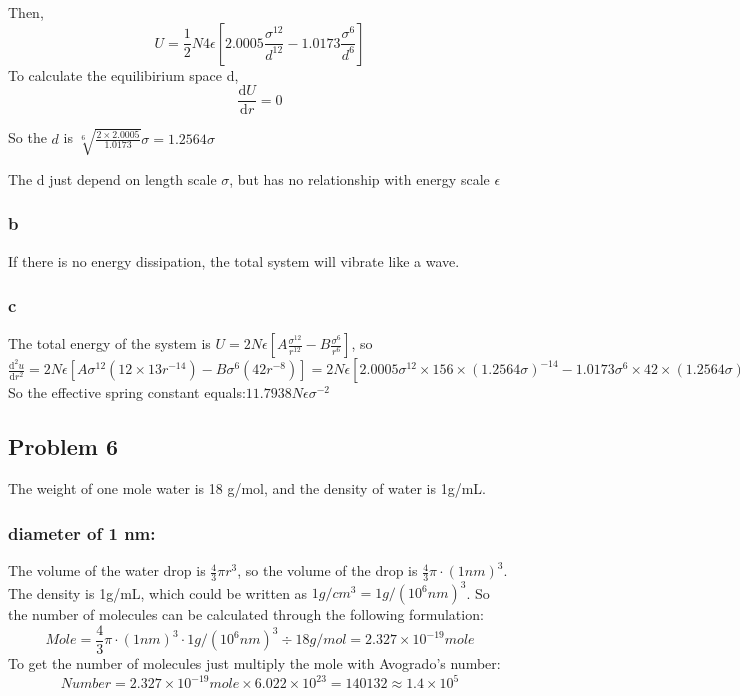 \documentclass[a4paper]{article}
\begin{document}
Then,
\begin{equation}
	U=\frac{1}{2}N 4 \epsilon [2.0005 \frac{\sigma^12}{d^12}-1.0173 \frac{\sigma^6}{d^6}]
\end{equation}
To calculate the equilibirium space d, 
\begin{equation}
	\frac{\mathrm{d} U}{\mathrm{d}r}=0
\end{equation}

So the $d$ is $\sqrt[6]{\frac{2 \times 2.0005}{1.0173}} \sigma=1.2564 \sigma$

The d just depend on length scale $\sigma$, but has no relationship with energy scale $\epsilon$

\subsubsection{b}
If there is no energy dissipation, the total system will vibrate like a wave. 

\subsubsection{c}
The total energy of the system is $U=2N \epsilon [A\frac{\sigma^{12}}{r^{12}}-B\frac{\sigma^{6}}{r^{6}}]$, so $\frac{\mathrm{d^{2}}u}{\mathrm{d}r^{2}}=2N \epsilon [A \sigma^{12}(12 \times 13 r^{-14})-B \sigma^{6}(42 r^{-8})]=2N\epsilon [2.0005\sigma^{12} \times 156 \times(1.2564 \sigma)^{-14}-1.0173\sigma^{6}\times 42 \times (1.2564 \sigma)^{-8}]$
So the effective spring constant equals:$11.7938N\epsilon \sigma^{-2}$

\subsection{Problem 6}
The weight of one mole water is 18 g/mol, and the density of water is 1g/mL.
\subsubsection{diameter of 1 nm:} The volume of the water drop is $\frac{4}{3}\pi r^{3}$, so the volume of the drop is $\frac{4}{3}\pi \cdot (1 nm)^{3}$. The density is 1g/mL, which could be written as $1g/cm^{3}=1g/(10^{6}nm)^{3}$. So the number of molecules can be calculated through the following formulation:
\begin{equation}
	Mole=\frac{4}{3}\pi \cdot (1 nm)^{3} \cdot 1g/(10^{6}nm)^{3} \div 18 g/mol=2.327 \times 10^{-19} mole 
\end{equation}
To get the number of molecules just multiply the mole with Avogrado's number:
\begin{equation}
	Number =2.327 \times 10^{-19} mole \times 6.022 \times 10^{23}=140132 \approx 1.4 \times 10^{5}
\end{equation}
\end{document}

